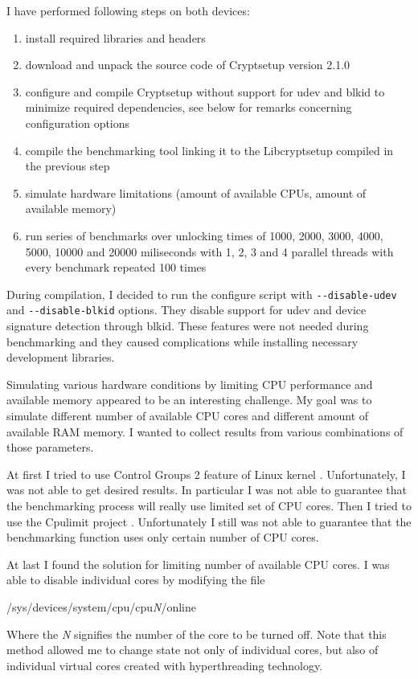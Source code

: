 \documentclass[nolof]{fithesis3}
\begin{document}
I have performed following steps on both devices:

\begin{enumerate}
\item install required libraries and headers

\item download and unpack the source code of Cryptsetup version 2.1.0

\item configure and compile Cryptsetup without support for udev and blkid to minimize required dependencies, see below for remarks concerning configuration options

\item compile the benchmarking tool linking it to the Libcryptsetup compiled in the previous step

\item simulate hardware limitations (amount of available CPUs, amount of available memory)

\item run series of benchmarks over unlocking times of 1000, 2000, 3000, 4000, 5000, 10000 and 20000 miliseconds with 1, 2, 3 and 4 parallel threads with every benchmark repeated 100 times
\end{enumerate}

During compilation, I decided to run the configure script with \verb+--disable-udev+ and \verb+--disable-blkid+ options. They disable support for udev and device signature detection through blkid. These features were not needed during benchmarking and they caused complications while installing necessary development libraries.

Simulating various hardware conditions by limiting CPU performance and available memory appeared to be an interesting challenge. My goal was to simulate different number of available CPU cores and different amount of available RAM memory. I wanted to collect results from various combinations of those parameters.

At first I tried to use Control Groups 2 feature of Linux kernel \parencite{cgroups2}. Unfortunately, I was not able to get desired results. In particular I was not able to guarantee that the benchmarking process will really use limited set of CPU cores. Then I tried to use the Cpulimit project \parencite{cpulimit}. Unfortunately I still was not able to guarantee that the benchmarking function uses only certain number of CPU cores.

At last I found the solution for limiting number of available CPU cores. I was able to disable individual cores by modifying the file 
\begin{tt}
/sys/devices/system/cpu/cpu\emph{N}/online
\end{tt}
 Where the \emph{N} signifies the number of the core to be turned off. Note that this method allowed me to change state not only of individual cores, but also of individual virtual cores created with hyperthreading technology.
\end{document}
